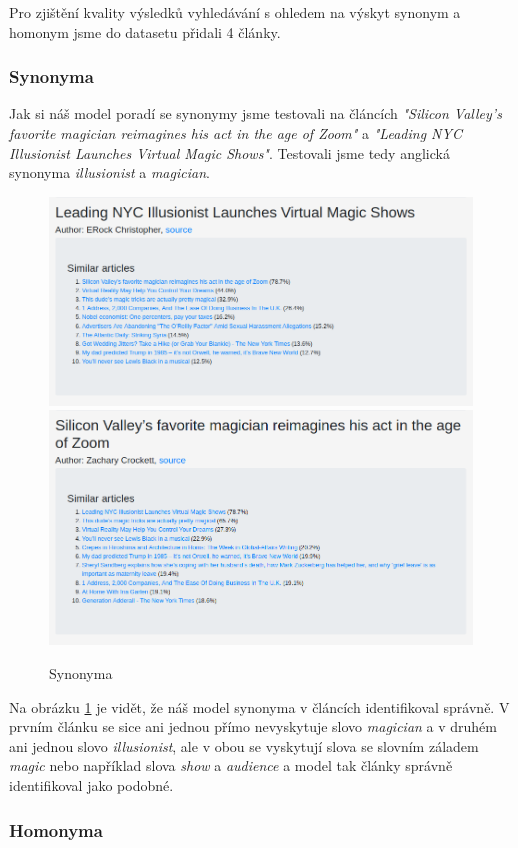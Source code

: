\documentclass[11pt]{scrartcl} %
\begin{document}
Pro zjištění kvality výsledků vyhledávání s ohledem na výskyt synonym a homonym jsme do datasetu přidali 4 články.

\subsubsection{Synonyma}

Jak si náš model poradí se synonymy jsme testovali na článcích \emph{"Silicon Valley’s favorite magician reimagines his act in the age of Zoom"} a \emph{"Leading NYC Illusionist Launches Virtual Magic Shows"}. Testovali jsme tedy anglická synonyma \emph{illusionist} a \emph{magician}.

\begin{figure}[h] %
	\centering
	\includegraphics[width=0.7\columnwidth]{images/synonyms_0.png}
	\includegraphics[width=0.7\columnwidth]{images/synonyms_1.png}
	\caption{Synonyma}
	\label{synonyms}
\end{figure}

\bigskip

Na obrázku \ref{synonyms} je vidět, že náš model synonyma v článcích identifikoval správně. V prvním článku se sice ani jednou přímo nevyskytuje slovo \emph{magician} a v druhém ani jednou slovo \emph{illusionist}, ale v obou se vyskytují slova se slovním záladem \emph{magic} nebo například slova \emph{show} a \emph{audience} a model tak články správně identifikoval jako podobné.

\subsubsection{Homonyma}
\end{document}
